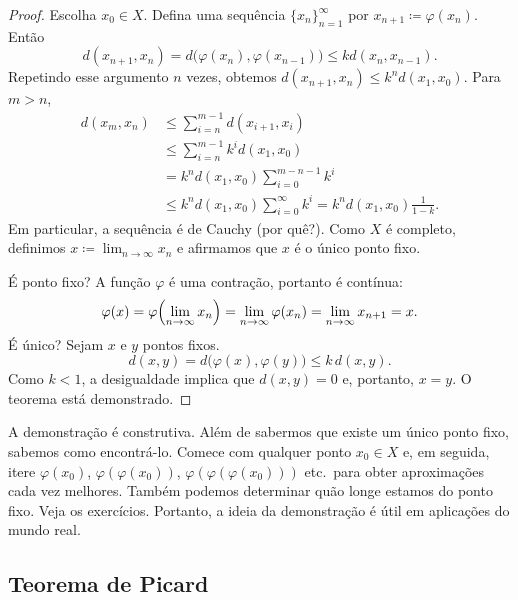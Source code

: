 \begin{proof}
Escolha $x_0 \in X$.
Defina uma sequência $\{ x_n \}_{n=1}^\infty$ por $x_{n+1} \coloneqq \varphi(x_n)$. Então
\begin{equation*}
d(x_{n+1},x_n) = d\bigl(\varphi(x_n),\varphi(x_{n-1})\bigr)
\leq k d(x_n,x_{n-1}) .
\end{equation*}
Repetindo esse argumento $n$ vezes, obtemos $d(x_{n+1},x_n) \leq k^n d(x_1,x_0)$.
Para $m > n$,
\begin{equation*}
\begin{split}
d(x_m,x_n)
& \leq \sum_{i=n}^{m-1} d(x_{i+1},x_i) \\
& \leq \sum_{i=n}^{m-1} k^i d(x_1,x_0) \\
& = k^n d(x_1,x_0) \sum_{i=0}^{m-n-1} k^i \\
& \leq k^n d(x_1,x_0) \sum_{i=0}^{\infty} k^i
= k^n d(x_1,x_0) \frac{1}{1-k} .
\end{split}
\end{equation*}
Em particular, a sequência é de Cauchy (por quê?). Como $X$ é completo,
definimos $x \coloneqq \lim_{n\to\infty} x_n$ e afirmamos que $x$
é o único ponto fixo.

É ponto fixo? A função $\varphi$ é uma contração,
portanto é contínua:
\begin{equation*}
\varphi(x) = \varphi\Bigl( \lim_{n\to\infty} x_n\Bigr) = \lim_{n\to\infty}
\varphi(x_n) =
\lim_{n\to\infty} x_{n+1} = x .
\end{equation*}
É único? Sejam $x$ e $y$ pontos fixos.
\begin{equation*}
d(x,y) = d\bigl(\varphi(x),\varphi(y)\bigr) \leq k\, d(x,y) .
\end{equation*}
Como $k < 1$, a desigualdade implica que $d(x,y) = 0$ e, portanto, $x=y$. O teorema está
demonstrado.
\end{proof}

A demonstração é construtiva. Além de sabermos
que existe um único ponto fixo, sabemos como encontrá-lo. Comece com
qualquer ponto $x_0 \in X$ e, em seguida, itere $\varphi(x_0)$,
$\varphi(\varphi(x_0))$,
$\varphi(\varphi(\varphi(x_0)))$ etc.\ para obter aproximações cada vez melhores.
Também podemos determinar quão longe estamos
do ponto fixo.
Veja os exercícios. Portanto, a ideia da demonstração
é útil em aplicações do mundo real.

\subsection{Teorema de Picard}

